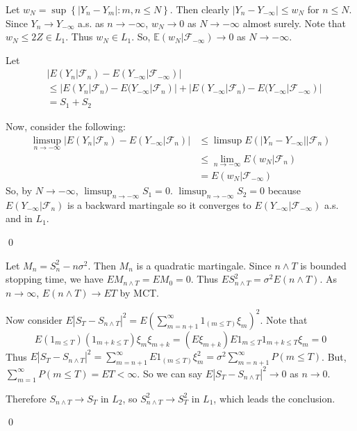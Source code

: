 \begin{problem}[4.7.2] \hfill

	Let $w_N = \sup \left\{ |Y_n - Y_m | : m, n \leq N \right\}$.
	Then clearly $|Y_n - Y_{-\infty} | \leq w_N$ for $n \leq N$.
	Since $Y_n \rightarrow Y_{-\infty}$ a.s. as $n \rightarrow -\infty$,
	$w_N \rightarrow 0$ as $N \rightarrow -\infty$ almost surely.
	Note that $w_N \leq 2Z \in L_1$.
	Thus $w_N \in L_1$.
	So, $\mathbb{E}(w_N | \mathcal{F}_{-\infty}) \rightarrow 0$ as $N\rightarrow -\infty$.

	Let 
	\[
		\begin{split}
			& \left | E(Y_n |\mathcal{F}_n) - E(Y_{-\infty} | \mathcal{F}_{-\infty} ) \right | \\
			& \leq |E(Y_n |\mathcal{F}_n) - E(Y_{-\infty} | \mathcal{F}_n) |
			+ |E(Y_{-\infty} | \mathcal{F}_n ) - E(Y_{-\infty} | \mathcal{F}_{-\infty})| \\
			& = S_1 + S_2
		\end{split}
	\]

	Now, consider the following:
	\[
\begin{split}
	\limsup_{n\rightarrow -\infty} \left | E(Y_n | \mathcal{F}_n) - E(Y_{-\infty} | \mathcal{F}_n) \right |
	& \leq \limsup E(\left | Y_n - Y_{-\infty} \right | | \mathcal{F}_n ) \\
	& \leq \lim_{n \rightarrow -\infty} E(w_N | \mathcal{F}_n) \\
	& = E(w_N |\mathcal{F}_{-\infty})
\end{split}
	\]
	So, by $N \rightarrow -\infty$, $\limsup_{n\rightarrow -\infty} S_1 = 0$.
	$\limsup_{n\rightarrow -\infty} S_2 = 0$ because $E(Y_{-\infty} | \mathcal{F}_n)$ is a backward martingale so it converges to $E(Y_{-\infty}| \mathcal{F}_{-\infty})$ a.s. and in $L_1$.

	\qed
\end{problem}

\begin{problem}[4.8.4] \hfill

	Let $M_n = S_n ^2 - n\sigma^2$. Then $M_n$ is a quadratic martingale.
	Since $n\wedge T$ is bounded stopping time, we have $EM_{n\wedge T} = EM_0 = 0$.
	Thus $ES_{n\wedge T}^2 = \sigma^2 E(n\wedge T)$.
	As $n\rightarrow \infty$, $E(n\wedge T) \rightarrow ET$ by MCT.

	Now consider $E|S_T - S_{n \wedge T}|^2 = E\left( \sum_{m = n+1}^\infty 1_{(m \leq T)} \xi_m \right)^2$.
	Note that 
	\[
		E (1_{m \leq T}) (1_{m+k \leq T}) \xi_m \xi_{m+k} = (E\xi_{m+k})E1_{m\leq T}1_{m+k\leq T}\xi_m = 0
	\]
	Thus $E|S_T - S_{n\wedge T}|^2 = \sum_{m=n+1}^\infty E1_{(m\leq T)}\xi_m^2 = \sigma^2 \sum_{m=n+1}^\infty P(m\leq T)$.
	But, $\sum_{m=1}^\infty P(m\leq T) = ET <\infty$.
	So we can say $E|S_T - S_{n \wedge T}|^2 \rightarrow 0$ as $n\rightarrow 0$.
	
	Therefore $S_{n\wedge T} \rightarrow S_T$ in $L_2$, so $S_{n\wedge T}^2 \rightarrow S_T^2$ in $L_1$, which leads the conclusion.

	\qed

\end{problem}

